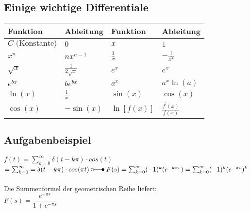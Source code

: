 \subsection{Einige wichtige Differentiale}
\begin{multicols}{2}
	\begin{tabular}{|l|l||l|l|}
    	\hline
    	\textbf{Funktion} & \textbf{Ableitung} & \textbf{Funktion} &
    	\textbf{Ableitung}\\
    	\hline
    	\hline
    	$C \text{ (Konstante)}$ & $0$ & $x$ & $1$\\
    	\hline
    	$x^n$ & $nx^{n-1}$ & $\frac1x$ & $-\frac{1}{x^2}$\\
    	\hline
    	$\sqrt{x}$ & $\frac{1}{2\sqrt{x}}$ & $e^x$ & $e^x$\\
    	\hline
    	$e^{bx}$ & $be^{bx}$ & $a^x$ & $a^x \ln(a)$\\
    	\hline
    	$\ln(x)$ & $\frac1x$ & $\sin(x)$ & $\cos(x)$\\
    	\hline
    	$\cos(x)$ & $-\sin(x)$ & $\ln[f(x)]$ & $\frac{f^{'}(x)}{f(x)}$\\
    	\hline	
    \end{tabular}

\columnbreak  	
\subsection{Aufgabenbeispiel}
$f(t) =\sum_{k=0}^{\infty}\delta (t-k\pi) \cdot cos(t)$ \\
$ = \sum_{k=0}^{\infty} = \delta (t-k\pi) \cdot cos(\pi t)  \\
\; \laplace \; 
F(s) = \sum_{k=0}^{\infty} (-1)^k(e^{-k\pi s}) \\
= \sum_{k=0}^{\infty} (-1)^k(e^{-\pi s})^k$ 
\\ \\
Die Summenformel der geometrischen Reihe liefert: \\
$F(s) = \dfrac{e^{-\pi s}}{1 +e^{-\pi s}}$
\end{multicols}
\renewcommand{\arraystretch}{\arraystretchOriginal} \\